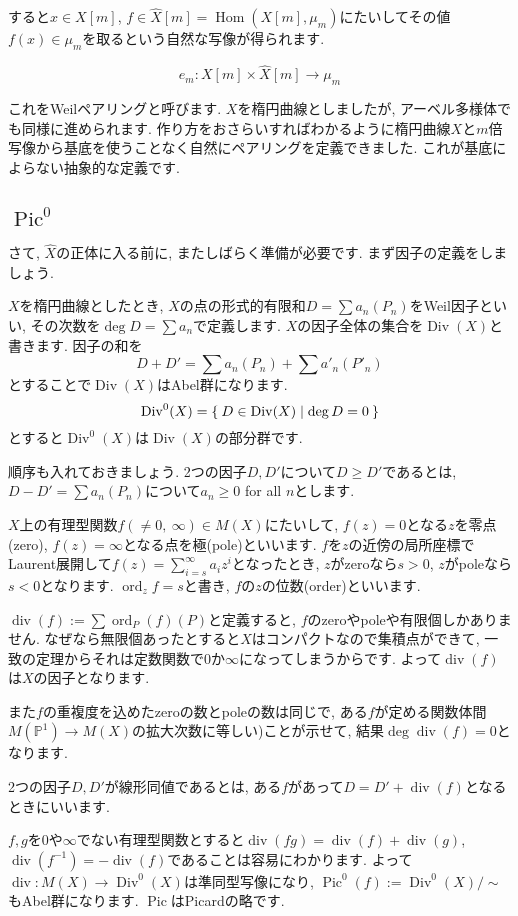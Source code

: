 \documentclass{jsarticle}
\newcommand{\PP}{\mathbb{P}}
\newcommand{\makeop}[1]{\mathop{\mathrm{#1}}\nolimits}
\def\Hom{\makeop{Hom}}
\def\Pic{\makeop{Pic}}
\def\Div{\makeop{Div}}
\def\div{\makeop{div}}
\def\ord{\makeop{ord}}
\theoremstyle{definition}
\numberwithin{theorem}{section}
\begin{document}
すると$x \in X[m]$, $f \in \hat{X}[m] = \Hom(X[m], \mu_m)$にたいしてその値$f(x) \in \mu_m$を取るという自然な写像が得られます.

\begin{equation*}
e_m: X[m] \times \hat{X}[m] \rightarrow \mu_m
\end{equation*}

これをWeilペアリングと呼びます. $X$を楕円曲線としましたが, アーベル多様体でも同様に進められます. 作り方をおさらいすればわかるように楕円曲線$X$と$m$倍写像から基底を使うことなく自然にペアリングを定義できました. これが基底によらない抽象的な定義です.

\subsection{$\Pic^0$}
さて, $\hat{X}$の正体に入る前に, またしばらく準備が必要です. まず因子の定義をしましょう.

$X$を楕円曲線としたとき, $X$の点の形式的有限和$D = \sum a_n(P_n)$をWeil因子といい, その次数を$\deg D = \sum a_n$で定義します. $X$の因子全体の集合を$\Div(X)$と書きます.
因子の和を
\[
D + D' = \sum a_n(P_n) + \sum a'_n (P'_n)
\]
とすることで$\Div(X)$はAbel群になります.
\[
\Div^0(X) = \Set{D \in \Div(X) | \deg D = 0}
\]
とすると$\Div^0(X)$は$\Div(X)$の部分群です.

順序も入れておきましょう. 2つの因子$D, D'$について$D \geq D'$であるとは, $D - D' = \sum a_n(P_n)$について$a_n \geq 0$ for all $n$とします.

$X$上の有理型関数$f(\neq 0,\ \infty) \in M(X)$にたいして, $f(z) = 0$となる$z$を零点(zero), $f(z) = \infty$となる点を極(pole)といいます. $f$を$z$の近傍の局所座標でLaurent展開して$f(z) = \sum_{i=s}^\infty a_iz^i$となったとき, $z$がzeroなら$s > 0$, $z$がpoleなら$s < 0$となります. $\ord_z f = s$と書き, $f$の$z$の位数(order)といいます.

$\div(f) := \sum \ord_P(f) (P)$と定義すると, $f$のzeroやpoleや有限個しかありません. なぜなら無限個あったとすると$X$はコンパクトなので集積点ができて, 一致の定理からそれは定数関数で0か$\infty$になってしまうからです. よって$\div(f)$は$X$の因子となります.

また$f$の重複度を込めたzeroの数とpoleの数は同じで, ある$f$が定める関数体間$M(\PP^1) \rightarrow M(X)$の拡大次数に等しい)ことが示せて, 結果$\deg \div(f) = 0$となります.

2つの因子$D, D'$が線形同値であるとは, ある$f$があって$D = D' + \div(f)$となるときにいいます.

$f, g$を0や$\infty$でない有理型関数とすると$\div(fg) = \div(f) + \div(g)$, $\div(f^{-1}) = -\div(f)$であることは容易にわかります. よって $\div: M(X) \rightarrow \Div^0(X)$は準同型写像になり, $\Pic^0(f) := \Div^0(X)/\sim$もAbel群になります. $\Pic$はPicardの略です.
\end{document}
